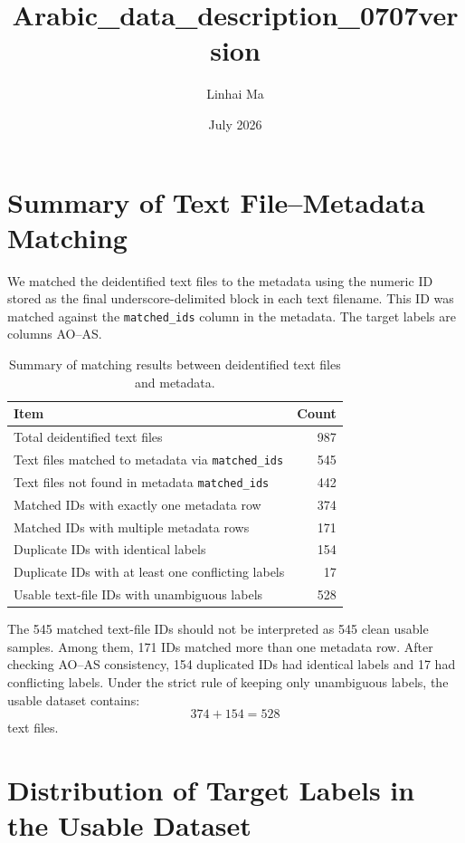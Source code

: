 \documentclass{article}
\title{Arabic\_data\_description\_0707version}
\author{Linhai Ma}
\date{July 2026}
\begin{document}
\maketitle


\section{Summary of Text File--Metadata Matching}

  We matched the deidentified text files to the metadata using the numeric ID stored as the final underscore-delimited block in each text filename. This ID was matched
  against the \texttt{matched\_ids} column in the metadata. The target labels are columns AO--AS.

  \begin{table}[htbp]
  \centering
  \begin{tabular}{lr}
  \toprule
  \textbf{Item} & \textbf{Count} \\
  \midrule
  Total deidentified text files & 987 \\
  \midrule
  Text files matched to metadata via \texttt{matched\_ids} & 545 \\
  Text files not found in metadata \texttt{matched\_ids} & 442 \\
  \midrule
  Matched IDs with exactly one metadata row & 374 \\
  Matched IDs with multiple metadata rows & 171 \\
  \midrule
  Duplicate IDs with identical labels & 154 \\
  Duplicate IDs with at least one conflicting labels & 17 \\
  \midrule
  Usable text-file IDs with unambiguous labels & 528 \\
  \bottomrule
  \end{tabular}
  \caption{Summary of matching results between deidentified text files and metadata.}
  \label{tab:matching-summary}
  \end{table}

  The 545 matched text-file IDs should not be interpreted as 545 clean usable samples. Among them, 171 IDs matched more than one metadata row. After checking AO--AS
  consistency, 154 duplicated IDs had identical labels and 17 had conflicting labels. Under the strict rule of keeping only unambiguous labels, the usable dataset
  contains:
  \[
  374 + 154 = 528
  \]
  text files.

  \section{Distribution of Target Labels in the Usable Dataset}
\end{document}
